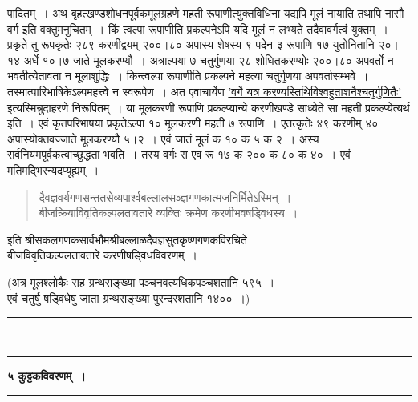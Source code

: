 \documentclass[11pt, openany]{book}
\begin{document}
\newpage

\begin{sloppypar}
\noindent पादितम्~। अथ बृहत्खण्डशोधनपूर्वकमूलग्रहणे महती रूपाणीत्युक्तविधिना यद्यपि मूलं नायाति तथापि नासौ वर्ग इति वक्तुमनुचितम्~। किं त्वल्पा रूपाणीति प्रकल्पनेऽपि यदि मूलं न लभ्यते तदैवावर्गत्वं युक्तम्~। प्रकृते तु रूपकृतेः २८९ करणीद्वयम् २००।८० अपास्य शेषस्य ९ पदेन ३ रूपाणि १७ युतोनितानि २०।१४ अर्धे १०।७ जाते मूलकरण्यौ~। अत्राल्पया ७ चतुर्गुणया २८ शोधितकरण्योः २००।८० अपवर्तो न भवतीत्येतावता न मूलाशुद्धिः~। किन्त्वल्पा रूपाणीति  प्रकल्पने महत्या चतुर्गुणया अपवर्तासम्भवे~। तस्मात्पारिभाषिकेऽल्पमहत्त्वे न स्वरूपेण~। अत एवाचार्येण \hyperref[4.46]{'वर्गे यत्र करण्यस्तिथिविश्वहुताशनैश्चतुर्गुणितैः'} इत्यस्मिन्नुदाहरणे निरूपितम्~। या मूलकरणी रूपाणि प्रकल्प्यान्ये करणीखण्डे साध्येते सा महती प्रकल्प्येत्यर्थ इति~। एवं कृतपरिभाषया प्रकृतेऽल्पा १० मूलकरणी महती ७ रूपाणि~। एतत्कृतेः ४९ करणीम् ४० अपास्योक्तवज्जाते मूलकरण्यौ ५।२~। एवं जातं मूलं क १० क ५ क २~। अस्य सर्वनियमपूर्वकत्वाच्छुद्धता भवति~। तस्य वर्गः स एव रू १७ क २०० क ८० क ४०~। एवं मतिमद्भिरन्यदप्यूह्यम्~।

\begin{quote}
{\color{violet}दैवज्ञवर्यगणसन्ततसेव्यपार्श्वबल्लालसञ्ज्ञगणकात्मजनिर्मितेऽस्मिन्~।\\
बीजक्रियाविवृतिकल्पलतावतारे व्यक्तिः क्रमेण करणीभवषड्विधस्य~।}
\end{quote}
\vspace{-1mm}

\begin{center}
इति श्रीसकलगणकसार्वभौमश्रीबल्लाळदैवज्ञसुतकृष्णगणकविरचिते\\
बीजविवृतिकल्पलतावतारे करणीषड्विधविवरणम्~। \\
\vspace{1mm}

(अत्र मूलश्लोकैः सह ग्रन्थसङ्ख्या पञ्चनवत्यधिकपञ्चशतानि ५९५~। \\
एवं चतुर्षु षड्विधेषु जाता ग्रन्थसङ्ख्या पुरन्दरशतानि १४००~।)
\vspace{6mm}

\rule{0.2\linewidth}{0.8pt}\\
\vspace{-4mm}

\rule{0.2\linewidth}{0.8pt}
\end{center}
\end{sloppypar}

\newpage
\thispagestyle{empty}

\begin{center}
\textbf{\large ५\; कुट्टकविवरणम्~।}\\
\rule{0.2\linewidth}{0.8pt}
\end{center}
\end{document}
